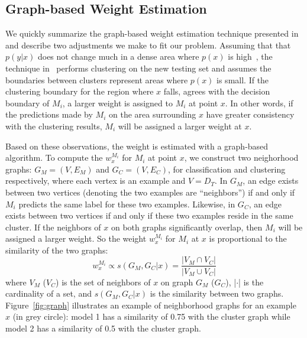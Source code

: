 \subsection{Graph-based Weight Estimation}\label{sec:gwe}
We quickly summarize the graph-based weight estimation technique presented in~\cite{lwe} and describe two adjustments we make to fit our problem.
Assuming that that $p(y|x)$ does not change much in a dense area where $p(x)$ is high~\cite{cluster}, 
the technique in~\cite{lwe} performs clustering on the new testing set and assumes the boundaries between clusters represent areas where $p(x)$ is small.
If the clustering boundary for the region where $x$ falls, agrees with the decision boundary of $M_i$, 
a larger weight is assigned to $M_i$ at point $x$.
In other words, if the predictions made by $M_i$ on the area surrounding $x$ have greater consistency with the clustering results, $M_i$ will be assigned
a larger weight at $x$. 

Based on these observations, the weight is estimated with a graph-based algorithm.
To compute the $w_{x}^{M_i}$ for $M_i$ at point $x$, we construct two neighorhood graphs: 
$G_M = (V, E_M)$ and $G_C = (V, E_C)$, for classification and clustering respectively, 
where each vertex is an example and $V = D_T$. In $G_M$, an edge exists between two vertices (denoting the two examples are ``neighbors'') if and only if $M_i$ predicts the same label for these two examples. Likewise, in $G_C$, an edge exists between two vertices if and only if these two examples reside in the same cluster.
If the neighbors of $x$ on both graphs significantly overlap, then $M_i$ will be assigned a larger weight.
So the weight $w_{x}^{M_i}$ for $M_i$ at $x$ is proportional to the similarity of the two graphs:
\begin{equation}\label{eq_sim}
w_{x}^{M_i} \propto s(G_M, G_C|x) = \frac {|V_M \cap V_C|} {|V_M \cup V_C|}
\end{equation}
where $V_M$ ($V_C$) is the set of neighbors of $x$ on graph $G_M$ ($G_C$), |$\cdot$| is the cardinality of a set, and $s(G_M, G_C|x)$ is the similarity between two graphs. 
Figure~\ref{fig:graph} illustrates an example of neighborhood graphs for an example $x$ (in grey circle): model 1 has a similarity of 0.75 with the cluster graph
 while model 2 has a similarity of 0.5 with the cluster graph.

